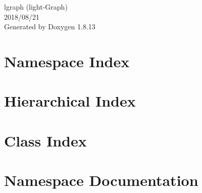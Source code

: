 \documentclass[twoside]{book}
\newcommand{\+}{\discretionary{\mbox{\scriptsize$\hookleftarrow$}}{}{}}
\newcommand{\clearemptydoublepage}{%
  \newpage{\pagestyle{empty}\cleardoublepage}%
}
\begin{document}
\hypersetup{pageanchor=false,
             bookmarksnumbered=true,
             pdfencoding=unicode
            }
\begin{titlepage}
\vspace*{7cm}
\begin{center}%
{\Large lgraph (light-\/\+Graph) \\[1ex]\large 2018/08/21 }\\
\vspace*{1cm}
{\large Generated by Doxygen 1.8.13}\\
\end{center}
\end{titlepage}
\clearemptydoublepage
{}
\tableofcontents
\clearemptydoublepage
{}
\hypersetup{pageanchor=true}

\chapter{Namespace Index}

\chapter{Hierarchical Index}

\chapter{Class Index}

\chapter{Namespace Documentation}





















\end{document}
